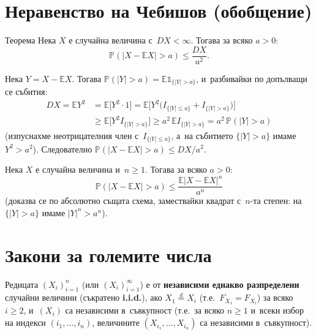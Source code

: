 \section{Неравенство на Чебишов (обобщение)}

\begin{thmbox}{Теорема}
Нека $X$ е случайна величина с~$DX<\infty$. Тогава за всяко $a>0$:
\[
  \mathbb P(|X-\mathbb EX|>a) \le \frac{DX}{a^2}.
\]
\end{thmbox}

\begin{proofbox}
Нека $Y=X-\mathbb EX$. Тогава $\mathbb P(|Y|>a)=\mathbb E\mathbb
1_{\{|Y|>a\}}$, и~разбивайки по допълващи се събития:
\begin{align*}
  DX = \mathbb EY^2 &= \mathbb E\big[Y^2\cdot1\big] = \mathbb E\big[Y^2\big(I_{\{|Y|\le a\}}+I_{\{|Y|>a\}}\big)\big]\\
  &\ge \mathbb E\big[Y^2I_{\{|Y|>a\}}\big] \ge a^2\,\mathbb EI_{\{|Y|>a\}} = a^2\,\mathbb P(|Y|>a)
\end{align*}
(изпуснахме неотрицателния член с~$I_{\{|Y|\le a\}}$, а~на
събитието $\{|Y|>a\}$ имаме $Y^2>a^2$). Следователно $\mathbb
P(|X-\mathbb EX|>a)\le DX/a^2$. \qedbg
\end{proofbox}

\begin{corbox}
Нека $X$ е случайна величина и~$n\ge1$. Тогава за всяко $a>0$:
\[
  \mathbb P(|X-\mathbb EX|>a) \le \frac{\mathbb E|X-\mathbb EX|^n}{a^n}
\]
(доказва се по абсолютно същата схема, замествайки квадрат с~$n$-та степен: на $\{|Y|>a\}$ имаме $|Y|^n>a^n$).
\end{corbox}

\section{Закони за големите числа}

\begin{defbox}
Редицата $(X_i)_{i=1}^{n}$ (или $(X_i)_{i=1}^{\infty}$) е от
\textbf{независими еднакво разпределени} случайни величини
(съкратено \textbf{i.i.d.}), ако $X_1\stackrel{d}{=}X_i$ (т.е.\
$F_{X_1}=F_{X_i}$) за всяко $i\ge2$, и~$(X_i)$ са независими в~съвкупност (т.е.\ за всяко $n\ge1$ и~всеки избор на индекси
$(i_1,\dots,i_n)$, величините $(X_{i_1},\dots,X_{i_n})$ са
независими в~съвкупност).
\end{defbox}

